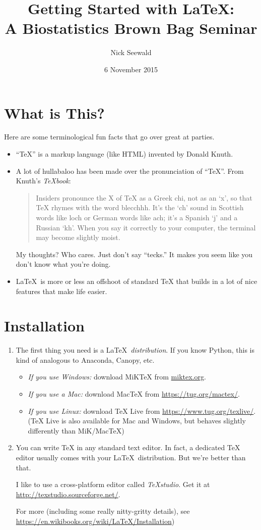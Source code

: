 \documentclass[12pt]{article}
\title{Getting Started with \LaTeX: \\ 
	\large{A Biostatistics Brown Bag Seminar}}
\author{Nick Seewald}
\date{6 November 2015}
\begin{document}
	\maketitle
	
	\section{What is This?}
	
	Here are some terminological fun facts that go over great at parties.
	\begin{itemize}
		\item ``TeX'' is a markup language (like HTML) invented by Donald Knuth.
		\item A lot of hullabaloo has been made over the pronunciation of ``TeX''. From Knuth's \textit{TeXbook}:
		\begin{quote}
			Insiders pronounce the X of TeX as a Greek chi, not as an ‘x’, so that TeX rhymes with the word blecchhh. It’s the ‘ch’ sound in Scottish words like loch or German words like ach; it’s a Spanish ‘j’ and a Russian ‘kh’. When you say it correctly to your computer, the terminal may become slightly moist.
		\end{quote}
		My thoughts? Who cares. Just don't say ``tecks.'' It makes you seem like you don't know what you're doing.
		\item \LaTeX \ is more or less an offshoot of standard TeX that builds in a lot of nice features that make life easier.
	\end{itemize}
	
	\section{Installation}
	
	\begin{enumerate}
		\item The first thing you need is a \LaTeX \ \textit{distribution}. If you know Python, this is kind of analogous to Anaconda, Canopy, etc.
		\begin{itemize}
			\item \textit{If you use Windows:} download MiKTeX from \url{miktex.org}.
			\item \textit{If you use a Mac:} download MacTeX from \url{https://tug.org/mactex/}.
			\item \textit{If you use Linux:} download TeX Live from \url{https://www.tug.org/texlive/}. (TeX Live is also available for Mac and Windows, but behaves slightly differently than MiK/MacTeX)
		\end{itemize}
		\item You can write TeX in any standard text editor. In fact, a dedicated TeX editor usually comes with your \LaTeX \ distribution. But we're better than that.
		
		I like to use a cross-platform editor called \textit{TeXstudio}. Get it at \url{http://texstudio.sourceforge.net/}.
		
		For more (including some really nitty-gritty details), see \url{https://en.wikibooks.org/wiki/LaTeX/Installation}) \cite{wikibooks}
	\end{enumerate}
	
\end{document}
